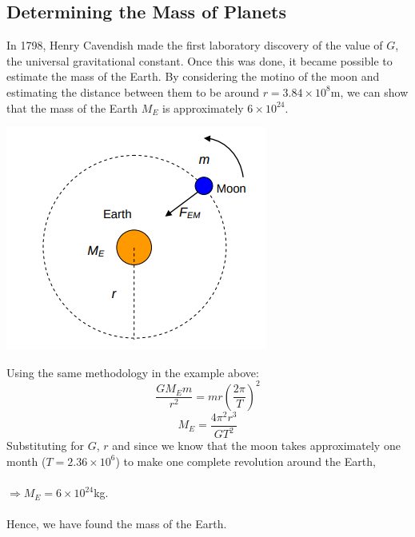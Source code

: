 \documentclass{article}
\begin{document}
\subsection{Determining the Mass of Planets}
In 1798, Henry Cavendish made the first laboratory discovery of the value of $G$, the universal gravitational constant. Once this was done, it became possible to estimate the mass of the Earth.
By considering the motino of the moon and estimating the distance between them to be around $r=3.84\times10^8$m, we can show that the mass of the Earth $M_E$ is approximately $6\times10^24$.
\begin{center}
    \includegraphics[scale=0.6]{assets/earthmoon.png}
\end{center}\leavevmode
Using the same methodology in the example above:
\begin{equation}
    \frac{GM_Em}{r^2}=mr(\frac{2\pi}{T})^2
\end{equation}
\begin{equation}
    M_E=\frac{4\pi^2r^3}{GT^2}
\end{equation}
Substituting for $G$, $r$ and since we know that the moon takes approximately one month ($T=2.36\times10^6$) to make one complete revolution around the Earth,
\\
\\$\Rightarrow M_E=6\times10^24$kg.
\\
\\Hence, we have found the mass of the Earth.
\pagebreak
\end{document}
